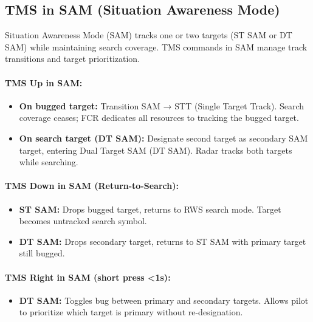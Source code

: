\documentclass[11pt, a4paper, twoside]{report}
\begin{document}
\subsection{TMS in SAM (Situation Awareness Mode)}
\label{sec:C4-S3-S1}

Situation Awareness Mode (SAM) tracks one or two targets (ST SAM or DT SAM) while maintaining search coverage. TMS commands in SAM manage track transitions and target prioritization.

\paragraph{TMS Up in SAM:}
\begin{itemize}
    \item \textbf{On bugged target:} Transition SAM → STT (Single Target Track). Search coverage ceases; FCR dedicates all resources to tracking the bugged target.
    \item \textbf{On search target (DT SAM):} Designate second target as secondary SAM target, entering Dual Target SAM (DT SAM). Radar tracks both targets while searching.
\end{itemize}

\paragraph{TMS Down in SAM (Return-to-Search):}
\begin{itemize}
    \item \textbf{ST SAM:} Drops bugged target, returns to RWS search mode. Target becomes untracked search symbol.
    \item \textbf{DT SAM:} Drops secondary target, returns to ST SAM with primary target still bugged.
\end{itemize}

\paragraph{TMS Right in SAM (short press <1s):}
\begin{itemize}
    \item \textbf{DT SAM:} Toggles bug between primary and secondary targets. Allows pilot to prioritize which target is primary without re-designation.
\end{itemize}
\end{document}
